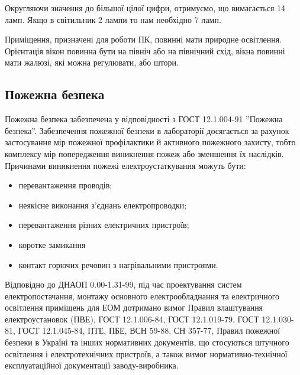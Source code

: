 \documentclass[ukrainian,utf8,simple,floatsingle,hpadding=5mm]{eskdtext}
\begin{document}
Округляючи значення до більшої цілої цифри, отримуємо, що вимагається 14 ламп. Якщо в світильник 2 лампи то нам необхідно
7 ламп.

 Приміщення, призначені для роботи ПК, повинні мати природне освітлення. Орієнтація вікон повинна бути на північ або на північний схід, вікна повинні мати жалюзі, які можна регулювати, або штори.
\subsection{Пожежна безпека}
Пожежна безпека забезпечена у відповідності з ГОСТ 12.1.004-91 ”Пожежна безпека”. 
Забезпечення пожежної безпеки в 
лабораторії досягається за рахунок застосування мір пожежної профілактики 
й активного пожежного захисту, тобто комплексу мір попередження виникнення 
пожеж або зменшення їх наслідків. Причинами виникнення пожежі 
електроустаткування можуть бути:
\begin{itemize}
 \item перевантаження проводів;
 \item неякісне виконання з'єднань електропроводки;
 \item перевантаження різних електричних пристроїв;
 \item коротке замикання
 \item контакт горючих речовин з нагрівальними пристроями.
\end{itemize}

Відповідно до ДНАОП 0.00-1.31-99, під час проектування систем електропостачання, монтажу 
основного електрообладнання та електричного освітлення приміщень для ЕОМ дотримано вимог 
Правил влаштування електроустановок (ПВЕ), ГОСТ 12.1.006-84, ГОСТ 12.1.019-79, ГОСТ 12.1.030-81, 
ГОСТ 12.1.045-84, ПТЕ, ПБЕ, ВСН 59-88,  СН 357-77, Правил пожежної безпеки в Україні та 
інших нормативних документів, що стосуються штучного освітлення і електротехнічних пристроїв, 
а також вимог нормативно-технічної експлуатаційної документації заводу-виробника.
\end{document}
